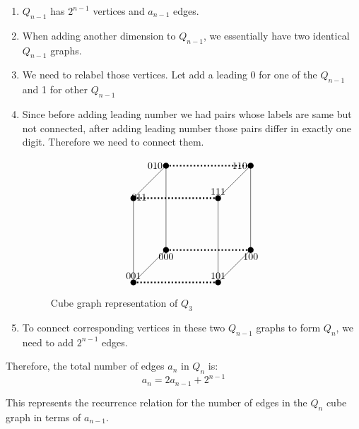 \documentclass[12pt]{article}
\begin{document}
\begin{enumerate}
    \item \( Q_{n-1} \) has \( 2^{n-1} \) vertices and \( a_{n-1} \) edges.
    \item When adding another dimension to \( Q_{n-1} \), we essentially have two identical \( Q_{n-1} \) graphs.
    \item We need to relabel those vertices. Let add a leading 0 for one of the \( Q_{n-1} \) and 1 for other \( Q_{n-1} \)
    \item Since before adding leading number we had pairs whose labels are same but not connected, after adding leading number those pairs differ in exactly one digit. Therefore we need to connect them. \\
\begin{figure}[H] 
    \[
\begin{tikzpicture}[scale=1.5]
    \coordinate[label=below:000] (000) at (0,0,0);
    \coordinate[label=above:001] (002) at (0,0,2);
    \coordinate[label=left:010] (020) at (0,2,0);
    \coordinate[label={[shift={(0.2,-0.2)}]above:011}] (022) at (0,2,2);
    \coordinate[label=below:100] (200) at (2,0,0);
    \coordinate[label=above:101] (202) at (2,0,2);
    \coordinate[label=left:110] (220) at (2,2,0);
    \coordinate[label=above:111] (222) at (2,2,2);

   \foreach \point in {(000),(002),(020),(022),(200),(202),(220),(222)} {
        \fill \point circle[radius=2pt];
    }
    \draw (000) -- (002) -- (022) -- (020) -- cycle;
    \draw (200) -- (202) -- (222) -- (220) -- cycle;
    \draw[dotted, line width=1.5pt]  (000) -- (200);
    \draw[dotted, line width=1.5pt] (002) -- (202);
    \draw[dotted, line width=1.5pt] (020) -- (220);
    \draw[dotted, line width=1.5pt] (022) -- (222);
\end{tikzpicture}
\]
\caption{Cube graph representation of \(Q_3\)}
\end{figure}
    \item To connect corresponding vertices in these two \( Q_{n-1} \) graphs to form \( Q_n \), we need to add \( 2^{n-1} \) edges.
\end{enumerate}

Therefore, the total number of edges \( a_n \) in \( Q_n \) is:
\[ a_n = 2a_{n-1} + 2^{n-1} \]

This represents the recurrence relation for the number of edges in the \( Q_n \) cube graph in terms of \( a_{n-1} \). \\ \\
\end{document}
